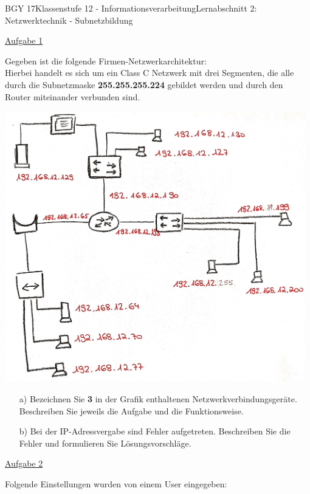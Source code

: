 \documentclass[oneside,openany,headings=optiontotoc,11pt,numbers=noenddot]{scrreprt}
\begin{document}
	\begin{worksheet}{BGY 17}{Klassenstufe 12 - Informationsverarbeitung}{Lernabschnitt 2: Netzwerktechnik - Subnetzbildung}
		\noindent
		\sffamily
		\begin{framed}
			\noindent
			\underline{Aufgabe 1}\\
			\par\noindent
			Gegeben ist die folgende Firmen-Netzwerkarchitektur:\\
			Hierbei handelt es sich um ein Class C Netzwerk mit drei Segmenten, die alle durch die Subnetzmaske \textbf{255.255.255.224} gebildet werden und durch den Router miteinander verbunden sind.\\
			\par\noindent
			\includegraphics[width=0.98\textwidth]{../99_Bilder/20190603.jpg}\\
			\begin{itemize}
				\item[a)] Bezeichnen Sie \textbf{3} in der Grafik enthaltenen Netzwerkverbindungsgeräte. Beschreiben Sie jeweils die Aufgabe und die Funktionsweise.
				\item[b)] Bei der IP-Adressvergabe sind Fehler aufgetreten. Beschreiben Sie die Fehler und formulieren Sie Lösungsvorschläge.
			\end{itemize}
			\newpage
			\noindent
			\underline{Aufgabe 2}\\
			\par\noindent
			Folgende Einstellungen wurden von einem User eingegeben:\\

\end{framed}
\end{worksheet}
\end{document}
